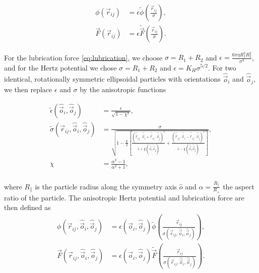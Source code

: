 \begin{equation}
    \begin{split}
    \phi(\vec{r}_{ij}) &= {\epsilon} \tilde{\phi}\left(\frac{\vec{r}_{ij}}{{\sigma}}\right) , \\
    \vec{F}(\vec{r}_{ij}) &= {\epsilon} \tilde{\vec{F}}\left(\frac{\vec{r}_{ij}}{{\sigma}}\right) .
    \end{split}
\end{equation}

For the lubrication force \eqref{eq:lubrication}, we choose
${\sigma}=R_1+R_2$ and ${\epsilon}=\frac{6\pi\eta R_1^2 R_2^2}{{\sigma^3}}$, and for the
Hertz potential we chose ${\sigma}=R_1+R_2$ and ${\epsilon}=K_H\sigma^{5/2}$. For two identical, rotationally
symmetric ellipsoidal particles with orientations $\hat{\vec{o}}_i$ and $\hat{\vec{o}}_j$, we then replace $\epsilon$ and $\sigma$ by
the anisotropic functions

\begin{equation}
    \begin{split}
    \tilde\epsilon\left(\hat{\vec{o}}_i, \hat{\vec{o}}_j\right) &= \frac{{\epsilon}}{\sqrt{1-\chi^2}} , \\
    \tilde\sigma\left(\vec{r}_{ij}, \hat{\vec{o}}_i, \hat{\vec{o}}_j\right) &= \frac{{\sigma}}{\sqrt{1-\frac{\chi}{2}\left[ \frac{\left(\hat{\vec{r}}_{ij}\cdot\hat{\vec{o}}_i+\hat{\vec{r}}_{ij}\cdot\hat{\vec{o}}_j\right)^2}{1+\chi\left(\hat{\vec{o}}_i\hat{\vec{o}}_j\right)} + \frac{\left(\hat{\vec{r}}_{ij}\cdot\hat{\vec{o}}_i-\hat{\vec{r}}_{ij}\cdot\hat{\vec{o}}_j\right)^2}{1-\chi\left(\hat{\vec{o}}_i\hat{\vec{o}}_j\right)} \right] }} , \\
    \chi &= \frac{\alpha^2-1}{\alpha^2+1} , \\
    \end{split}
\end{equation}

where $R_{\parallel}$ is the particle radius along the
symmetry axis $\hat{o}$ and $\alpha=\frac{R_{\parallel}}{R_{\perp}}$ the aspect
ratio of the particle. The anisotropic Hertz potential and lubrication
force are then defined as
%
\begin{equation}
    \begin{split}
    \phi\left(\vec{r}_{ij}, \hat{\vec{o}}_i, \hat{\vec{o}}_j\right) &= \epsilon\left(\hat{\vec{o}}_i, \hat{\vec{o}}_j\right) \tilde{\phi}\left(\frac{\vec{r}_{ij}}{\sigma\left(\vec{r}_{ij}, \hat{\vec{o}}_i, \hat{\vec{o}}_j\right)} \right) , \\
    \vec{F}\left(\vec{r}_{ij}, \hat{\vec{o}}_i, \hat{\vec{o}}_j\right) &= \epsilon\left(\hat{\vec{o}}_i, \hat{\vec{o}}_j\right) \tilde{\vec{F}}\left(\frac{\vec{r}_{ij}}{\sigma\left(\vec{r}_{ij}, \hat{\vec{o}}_i, \hat{\vec{o}}_j\right)} \right) .
    \end{split}
\end{equation}

